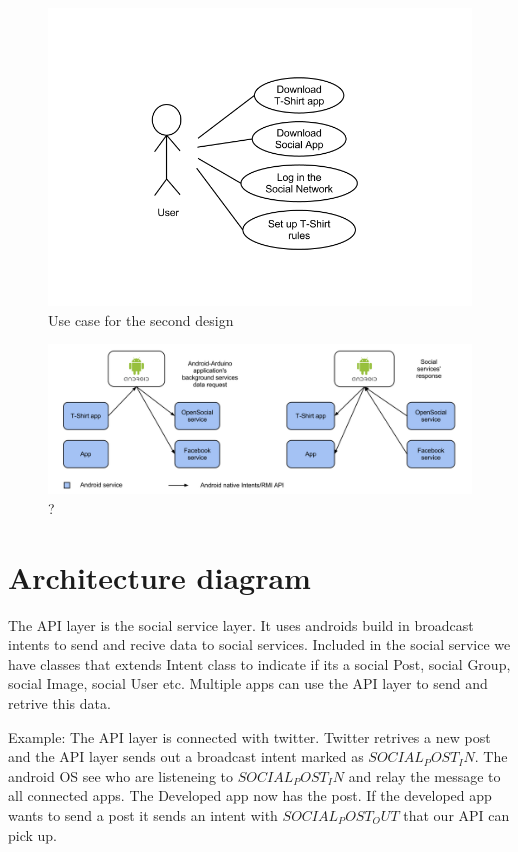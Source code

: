 \begin{figure}[h!]
\centering \includegraphics[scale=0.35]{img/architecture-usecase2.png}
\caption{Use case for the second design}
\label{fig:use-case2}
\end{figure}

\begin{figure}[h!]
\centering \includegraphics[scale=0.35]{img/architecture-reqresp.png}
\caption{?}
\label{fig:reqresp}
\end{figure}

\newpage
\section{Architecture diagram}

The API layer is the social service layer. It uses androids build in broadcast intents to send and
recive data to social services. Included in the social service we have classes that extends Intent
class to indicate if its a social Post, social Group, social Image, social User etc. Multiple apps
can use the API layer to send and retrive this data.

Example:
The API layer is connected with twitter. Twitter retrives a new post and the API layer sends out
a broadcast intent marked as $SOCIAL_POST_IN$. The android OS see who are listeneing to $SOCIAL_POST_IN$ and relay the message to all connected apps. The Developed app now has the post. If the developed app wants to send a post it sends an intent with $SOCIAL_POST_OUT$ that our API can pick up.

